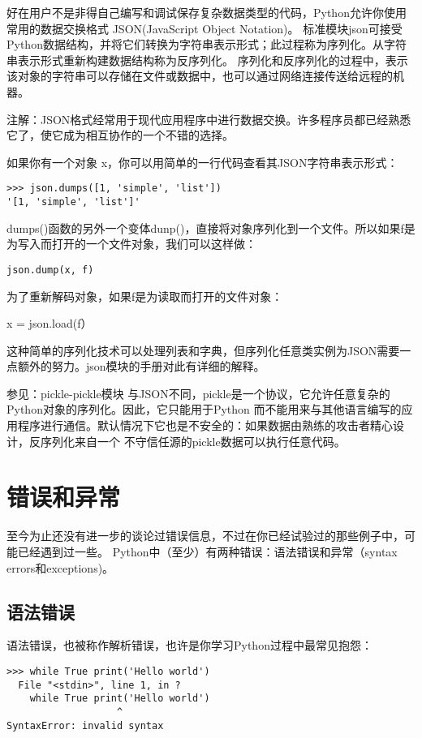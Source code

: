 \documentclass[UTF8]{ctexart}
\begin{document}
好在用户不是非得自己编写和调试保存复杂数据类型的代码，Python允许你使用常用的数据交换格式 JSON(JavaScript Object Notation)。
标准模块json可接受Python数据结构，并将它们转换为字符串表示形式；此过程称为序列化。从字符串表示形式重新构建数据结构称为反序列化。
序列化和反序列化的过程中，表示该对象的字符串可以存储在文件或数据中，也可以通过网络连接传送给远程的机器。

注解：JSON格式经常用于现代应用程序中进行数据交换。许多程序员都已经熟悉它了，使它成为相互协作的一个不错的选择。

如果你有一个对象 x，你可以用简单的一行代码查看其JSON字符串表示形式：
\begin{verbatim}
>>> json.dumps([1, 'simple', 'list'])
'[1, 'simple', 'list']'
\end{verbatim}

dumps()函数的另外一个变体dunp()，直接将对象序列化到一个文件。所以如果f是为写入而打开的一个文件对象，我们可以这样做：
\begin{verbatim}
json.dump(x, f)
\end{verbatim}

为了重新解码对象，如果f是为读取而打开的文件对象：

x = json.load(f）

这种简单的序列化技术可以处理列表和字典，但序列化任意类实例为JSON需要一点额外的努力。json模块的手册对此有详细的解释。

参见：pickle-pickle模块 与JSON不同，pickle是一个协议，它允许任意复杂的Python对象的序列化。因此，它只能用于Python
而不能用来与其他语言编写的应用程序进行通信。默认情况下它也是不安全的：如果数据由熟练的攻击者精心设计，反序列化来自一个
不守信任源的pickle数据可以执行任意代码。

\section{错误和异常}
至今为止还没有进一步的谈论过错误信息，不过在你已经试验过的那些例子中，可能已经遇到过一些。
Python中（至少）有两种错误：语法错误和异常（syntax errors和exceptions)。
\subsection{语法错误}
语法错误，也被称作解析错误，也许是你学习Python过程中最常见抱怨：
\begin{verbatim}
>>> while True print('Hello world')
  File "<stdin>", line 1, in ?
    while True print('Hello world')
                   ^
SyntaxError: invalid syntax
\end{verbatim}
\end{document}
